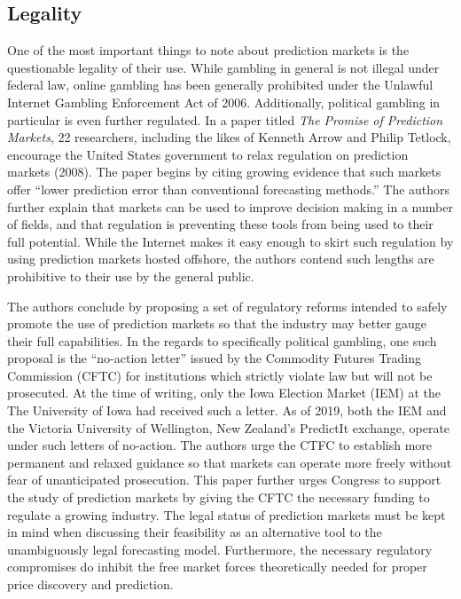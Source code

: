 \documentclass[11pt,]{article}
\begin{document}
\hypertarget{legality}{%
\subsection{Legality}\label{legality}}

One of the most important things to note about prediction markets is the
questionable legality of their use. While gambling in general is not
illegal under federal law, online gambling has been generally prohibited
under the Unlawful Internet Gambling Enforcement Act of 2006.
Additionally, political gambling in particular is even further
regulated. In a paper titled \emph{The Promise of Prediction Markets},
22 researchers, including the likes of Kenneth Arrow and Philip Tetlock,
encourage the United States government to relax regulation on prediction
markets (2008). The paper begins by citing growing evidence that such
markets offer ``lower prediction error than conventional forecasting
methods.'' The authors further explain that markets can be used to
improve decision making in a number of fields, and that regulation is
preventing these tools from being used to their full potential. While
the Internet makes it easy enough to skirt such regulation by using
prediction markets hosted offshore, the authors contend such lengths are
prohibitive to their use by the general public.

The authors conclude by proposing a set of regulatory reforms intended
to safely promote the use of prediction markets so that the industry may
better gauge their full capabilities. In the regards to specifically
political gambling, one such proposal is the ``no-action letter'' issued
by the Commodity Futures Trading Commission (CFTC) for institutions
which strictly violate law but will not be prosecuted. At the time of
writing, only the Iowa Election Market (IEM) at the The University of
Iowa had received such a letter. As of 2019, both the IEM and the
Victoria University of Wellington, New Zealand's PredictIt exchange,
operate under such letters of no-action. The authors urge the CTFC to
establish more permanent and relaxed guidance so that markets can
operate more freely without fear of unanticipated prosecution. This
paper further urges Congress to support the study of prediction markets
by giving the CFTC the necessary funding to regulate a growing industry.
The legal status of prediction markets must be kept in mind when
discussing their feasibility as an alternative tool to the unambiguously
legal forecasting model. Furthermore, the necessary regulatory
compromises do inhibit the free market forces theoretically needed for
proper price discovery and prediction.
\end{document}
